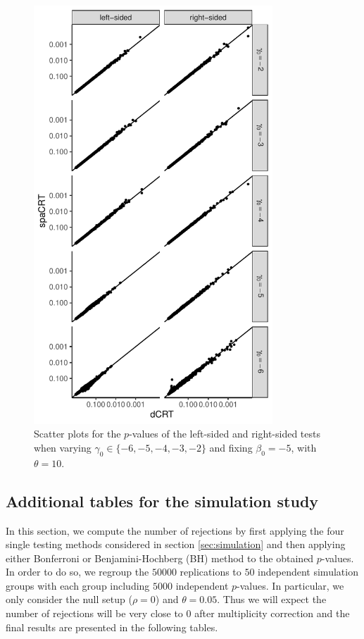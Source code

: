 \documentclass[12pt]{article}
\theoremstyle{definition}
\begin{document}
\begin{figure}
  \centering
  \includegraphics[width=0.8\textwidth]{figures-and-tables/simulation/QQ/plot-bin-NB-normal-B-50000-n-5000-5e3-n5-n5-disp-10full-dCRT-spaCRT-varying-gamma.pdf}
  \caption{Scatter plots for the $p$-values of the left-sided and right-sided tests when varying $\gamma_0\in \{-6,-5,-4,-3,-2\}$ and fixing $\beta_0=-5$, with $\theta = 10$.}
  \label{fig:simulation-dot-plot-varying-gamma-theta-10}
\end{figure}


\newpage

\subsection{Additional tables for the simulation study}\label{sec:additional_table_simulation}

{\color{red}

In this section, we compute the number of rejections by first applying the four single testing methods considered in section \ref{sec:simulation} and then applying either Bonferroni or Benjamini-Hochberg (BH) method to the obtained $p$-values. In order to do so, we regroup the $50000$ replications to $50$ independent simulation groups with each group including $5000$ independent $p$-values. In particular, we only consider the null setup ($\rho=0$) and $\theta=0.05$. Thus we will expect the number of rejections will be very close to $0$ after multiplicity correction and the final results are presented in the following tables.
}
\end{document}
